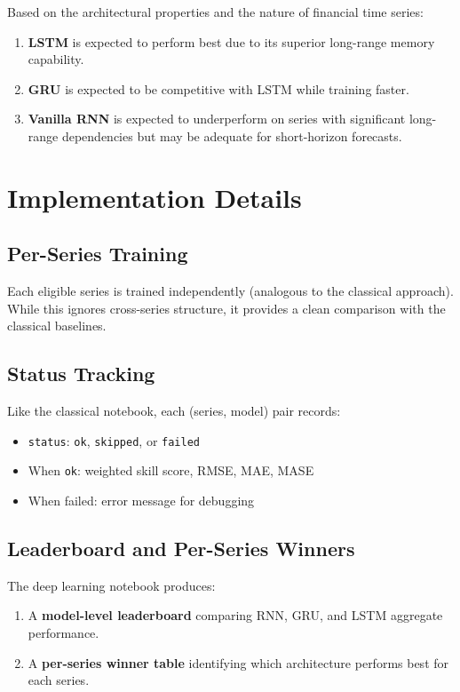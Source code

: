 Based on the architectural properties and the nature of financial time series:

\begin{enumerate}
    \item \textbf{LSTM} is expected to perform best due to its superior long-range memory capability.
    \item \textbf{GRU} is expected to be competitive with LSTM while training faster.
    \item \textbf{Vanilla RNN} is expected to underperform on series with significant long-range dependencies but may be adequate for short-horizon forecasts.
\end{enumerate}

\section{Implementation Details}

\subsection{Per-Series Training}

Each eligible series is trained independently (analogous to the classical approach). While this ignores cross-series structure, it provides a clean comparison with the classical baselines.

\subsection{Status Tracking}

Like the classical notebook, each (series, model) pair records:
\begin{itemize}
    \item \texttt{status}: \texttt{ok}, \texttt{skipped}, or \texttt{failed}
    \item When \texttt{ok}: weighted skill score, RMSE, MAE, MASE
    \item When failed: error message for debugging
\end{itemize}

\subsection{Leaderboard and Per-Series Winners}

The deep learning notebook produces:
\begin{enumerate}
    \item A \textbf{model-level leaderboard} comparing RNN, GRU, and LSTM aggregate performance.
    \item A \textbf{per-series winner table} identifying which architecture performs best for each series.
\end{enumerate}

